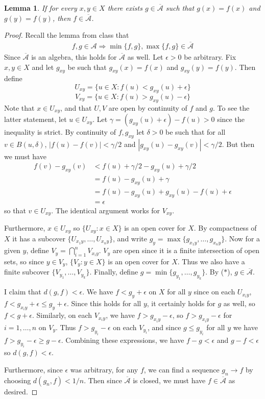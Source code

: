\documentclass[12pt, a4paper]{book}
\newtheorem{lemma}[theorem]{Lemma}
\theoremstyle{nonumberplain}
\newtheorem{proof}{Proof}
\begin{document}
\begin{lemma}
    If for every $x,y\in X$ there exists $g\in\overline{\mathcal{A}}$ such that $g(x)=f(x)$ and $g(y)=f(y)$, then $f\in\overline{\mathcal{A}}$.
\end{lemma}
\begin{proof}
    Recall the lemma from class that
    \begin{align*}
        f,g\in\mathcal{A}\Rightarrow\min\{f,g\},\max\{f,g\}\in\overline{\mathcal{A}}\tag{$*$}
    \end{align*}
    Since $\overline{\mathcal{A}}$ is an algebra, this holds for $\overline{\mathcal{A}}$ as well.
    Let $\epsilon>0$ be arbitrary.
    Fix $x,y\in X$ and let $g_{xy}$ be such that $g_{xy}(x)=f(x)$ and $g_{xy}(y)=f(y)$.
    Then define
    \[U_{xy}=\{u\in X:f(u)<g_{xy}(u)+\epsilon\}\]
    \[V_{xy}=\{u\in X:f(u)>g_{xy}(u)-\epsilon\}\]
    Note that $x\in U_{xy}$, and that $U,V$ are open by continuity of $f$ and $g$.
    To see the latter statement, let $u\in U_{xy}$.
    Let $\gamma=(g_{xy}(u)+\epsilon)-f(u)>0$ since the inequality is strict.
    By continuity of $f,g_{xy}$ let $\delta>0$ be such that for all $v\in B(u,\delta)$, $|f(u)-f(v)|<\gamma/2$ and $|g_{xy}(u)-g_{xy}(v)|<\gamma/2$.
    But then we must have
    \begin{align*}
        f(v)-g_{xy}(v) &< f(u)+\gamma/2-g_{xy}(u)+\gamma/2\\
                       &= f(u)-g_{xy}(u)+\gamma\\
                       &= f(u)-g_{xy}(u)+g_{xy}(u)-f(u)+\epsilon\\
                       &= \epsilon
    \end{align*}
    so that $v\in U_{xy}$.
    The identical argument works for $V_{xy}$.

    Furthermore, $x\in U_{xy}$ so $\{U_{xy}:x\in X\}$ is an open cover for $X$.
    By compactness of $X$ it has a subcover $\{U_{x_1y},\ldots,U_{x_ny}\}$, and write $g_y=\max\{g_{x_1y},\ldots,g_{x_ny}\}$.
    Now for a given $y$, define $V_y=\bigcap\limits_{i=1}^n V_{x_iy}$.
    $V_y$ are open since it is a finite intersection of open sets, so since $y\in V_y$, $\{V_y:y\in X\}$ is an open cover for $X$.
    Thus we also have a finite subcover $\{V_{y_1},\ldots,V_{y_k}\}$.
    Finally, define $g=\min\{g_{y_1},\ldots,g_{y_k}\}$.
    By ($*$), $g\in\mathcal{\overline{A}}$.

    I claim that $d(g,f)<\epsilon$.
    We have $f<g_y+\epsilon$ on $X$ for all $y$ since on each $U_{x_iy}$, $f<g_{x_iy}+\epsilon\leq g_y+\epsilon$.
    Since this holds for all $y$, it certainly holds for $g$ as well, so $f<g+\epsilon$.
    Similarly, on each $V_{x_iy}$, we have $f>g_{x_iy}-\epsilon$, so $f>g_{x_iy}-\epsilon$ for $i=1,\ldots,n$ on $V_y$.
    Thus $f>g_{y_i}-\epsilon$ on each $V_{y_i}$, and since $g\leq g_{y_i}$ for all $y$ we have $f>g_{y_i}-\epsilon\geq g-\epsilon$.
    Combining these expressions, we have $f-g<\epsilon$ and $g-f<\epsilon$ so $d(g,f)<\epsilon$.

    Furthermore, since $\epsilon$ was arbitrary, for any $f$, we can find a sequence $g_n\to f$ by choosing $d(g_n,f)<1/n$.
    Then since $\overline{\mathcal{A}}$ is closed, we must have $f\in\overline{\mathcal{A}}$ as desired.
\end{proof}
\end{document}
